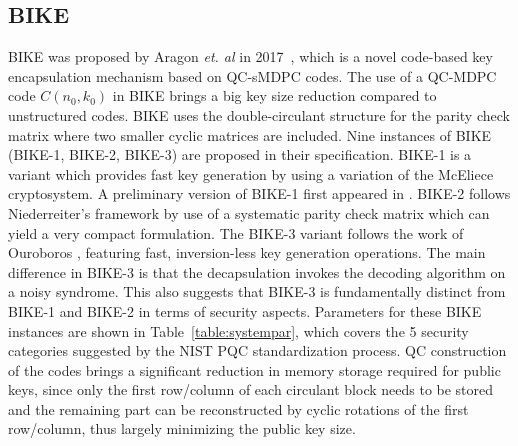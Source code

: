 \documentclass[runningheads]{llncs}
\begin{document}
\subsection{BIKE}
%
BIKE was proposed by Aragon \textit{et. al} in 2017~\cite{aragon2017bike},
which is a novel code-based key encapsulation mechanism based on QC-sMDPC codes.
The use of a QC-MDPC code $C(n_0,k_0)$ in BIKE brings a big key size reduction
compared to unstructured codes.
BIKE uses the double-circulant structure for the parity check matrix
where two smaller cyclic matrices are included.
Nine instances of BIKE (BIKE-1, BIKE-2, BIKE-3) are proposed
in their specification. 
BIKE-1 is a variant which provides fast key generation 
by using a variation of the McEliece cryptosystem. 
A preliminary version of BIKE-1 first appeared in \cite{barreto2017cake}.
BIKE-2 follows Niederreiter's framework by use of 
a systematic parity check matrix which can yield a very compact formulation. 
The BIKE-3 variant follows the work of Ouroboros \cite{deneuville2017ouroboros}, featuring fast, inversion-less key generation operations. 
The main difference in BIKE-3 is that the decapsulation invokes the decoding algorithm on a noisy syndrome. This also suggests that BIKE-3 is fundamentally distinct from BIKE-1 and BIKE-2 in terms of security aspects. 
Parameters for these BIKE instances are shown in Table~\ref{table:systempar},
which covers the 5 security categories suggested by the NIST PQC standardization process.
QC construction of the codes brings a significant reduction
in memory storage required for public keys,
since only the first row/column of each circulant block
needs to be stored and the remaining part can be
reconstructed by cyclic rotations of the first row/column,
thus largely minimizing the public key size. %
\end{document}
